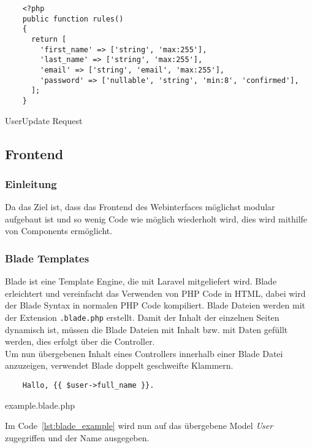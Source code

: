 \begin{listing}[H]
  \begin{verbatim}
    <?php
    public function rules()
    {
      return [
        'first_name' => ['string', 'max:255'],
        'last_name' => ['string', 'max:255'],
        'email' => ['string', 'email', 'max:255'],
        'password' => ['nullable', 'string', 'min:8', 'confirmed'],
      ];
    }
  \end{verbatim}
  \caption{UserUpdate Request}
  \label{lst:userupdate_request}
\end{listing}

\subsection{Frontend}

\subsubsection{Einleitung}

Da das Ziel ist, dass das Frontend des Webinterfaces möglichst modular aufgebaut
ist und so wenig Code wie möglich wiederholt wird, dies wird mithilfe von
Components ermöglicht.

\subsubsection{Blade Templates}
Blade ist eine Template Engine, die mit Laravel mitgeliefert wird. Blade
erleichtert und vereinfacht das Verwenden von PHP Code in HTML, dabei wird der
Blade Syntax in normalen PHP Code kompiliert. Blade Dateien werden mit der
Extension \verb|.blade.php| erstellt. Damit der Inhalt der einzelnen Seiten
dynamisch ist, müssen die Blade Dateien mit Inhalt bzw. mit Daten gefüllt werden, dies erfolgt über die Controller.\\

Um nun übergebenen Inhalt eines Controllers innerhalb einer Blade Datei anzuzeigen, verwendet Blade doppelt
geschweifte Klammern.

\begin{listing}[H]
  \begin{verbatim}
    Hallo, {{ $user->full_name }}.
  \end{verbatim}
  \caption{example.blade.php}
  \label{lst:blade_example}
\end{listing}

Im Code~\ref{lst:blade_example} wird nun auf das übergebene Model \textit{User}
zugegriffen und der Name ausgegeben.

